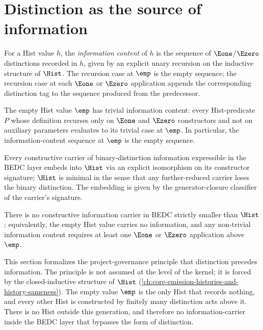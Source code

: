 \section{Distinction as the source of information}
\label{sec:observer-distinction-source}

\begin{definition}
\label{def:hist-information-content}
For a Hist value \(h\), the \emph{information content} of \(h\) is the sequence of \(\Eone\)/\(\Ezero\) distinctions recorded in \(h\), given by an explicit unary recursion on the inductive structure of \(\Hist\). The recursion case at \(\emp\) is the empty sequence; the recursion case at each \(\Eone\) or \(\Ezero\) application appends the corresponding distinction tag to the sequence produced from the predecessor.
\end{definition}
\begin{theorem}
\label{thm:pre-distinction-void}
The empty Hist value \(\emp\) has trivial information content: every Hist-predicate \(P\) whose definition recurses only on \(\Eone\) and \(\Ezero\) constructors and not on auxiliary parameters evaluates to its trivial case at \(\emp\). In particular, the information-content sequence at \(\emp\) is the empty sequence.
\end{theorem}
\begin{theorem}
\label{thm:hist-minimal-carrier}
Every constructive carrier of binary-distinction information expressible in the BEDC layer embeds into \(\Hist\) via an explicit isomorphism on its constructor signature; \(\Hist\) is minimal in the sense that any further-reduced carrier loses the binary distinction. The embedding is given by the generator-closure classifier of the carrier's signature.
\end{theorem}
\begin{corollary}
\label{cor:information-requires-distinction}
There is no constructive information carrier in BEDC strictly smaller than \(\Hist\); equivalently, the empty Hist value carries no information, and any non-trivial information content requires at least one \(\Eone\) or \(\Ezero\) application above \(\emp\).
\end{corollary}
\begin{remark}[Reading]
\label{rem:distinction-foundationalism-reading}
This section formalizes the project-governance principle that distinction precedes information. The principle is not assumed at the level of the kernel; it is forced by the closed-inductive structure of \(\Hist\) (\autoref{ch:core-emission-histories-and-history-sameness}). The empty value \(\emp\) is the only Hist that records nothing, and every other Hist is constructed by finitely many distinction acts above it. There is no Hist outside this generation, and therefore no information-carrier inside the BEDC layer that bypasses the form of distinction.
\end{remark}

